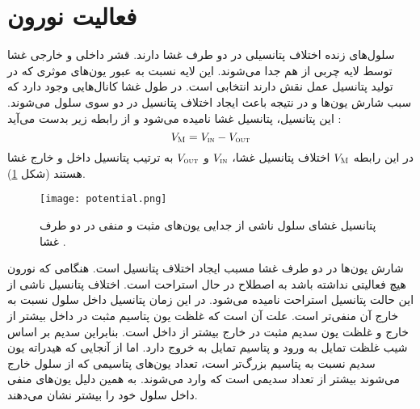 

\section{فعالیت نورون}
سلول‌های زنده اختلاف پتانسیلی در دو طرف غشا دارند.  قشر داخلی و خارجی  غشا توسط لایه چربی از هم جدا می‌شوند.  این لایه نسبت به عبور یون‌های موثری که در تولید پتانسیل عمل نقش دارند انتخابی است. در طول غشا کانال‌هایی وجود دارد که سبب شارش یون‌ها و در نتیجه باعث ایجاد اختلاف پتانسیل در دو سوی سلول می‌شوند. این پتانسیل، پتانسیل غشا نامیده می‌شود و از رابطه زیر بدست می‌آید \cite{ermen}:
\begin{equation}
V_{\textsc{M}} = V_{\textsc{in}} - V_{\textsc{out}}
\end{equation}
در این رابطه  $V_{\textsc{M}}$  اختلاف پتانسیل غشا، $V_{\textsc{in}}$ و 
$V_{\textsc{out}}$ به ترتیب پتانسیل داخل و خارج غشا هستند (شکل \ref{fig:potential}).
\begin{figure} [htbp]
\centering
\texttt{[image: potential.png]} 
\caption[پتانسیل غشای سلول] {\footnotesize پتانسیل غشای سلول ناشی از جدایی یون‌های مثبت و منفی در دو طرف غشا \cite{ermen}.}
\label{fig:potential}
\end{figure} 
شارش یون‌ها در دو طرف غشا مسبب ایجاد اختلاف پتانسیل است. هنگامی که نورون هیچ فعالیتی نداشته باشد به اصطلاح در حال استراحت است. اختلاف پتانسیل ناشی از این حالت پتانسیل استراحت نامیده می‌شود. در این زمان پتانسیل داخل سلول نسبت به خارج آن منفی‌تر است. علت آن است که غلظت یون پتاسیم مثبت در داخل بیشتر از خارج و غلظت یون سدیم مثبت در خارج بیشتر از داخل است. بنابراین سدیم بر اساس شیب غلظت تمایل به ورود و پتاسیم تمایل به خروج دارد. اما از آنجایی که هیدراته یون سدیم نسبت به پتاسیم بزرگ‌تر است، تعداد یون‌های پتاسیمی که از سلول خارج می‌شوند بیشتر از تعداد سدیمی است که وارد می‌شوند. به همین دلیل یون‌های منفی داخل سلول خود را بیشتر نشان می‌دهند.

